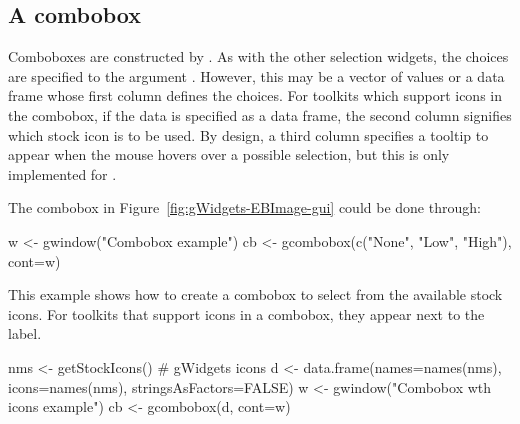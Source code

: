 



\subsection{A combobox}
\label{sec:gWidgets-combobox}

Comboboxes are constructed by . As with the
other selection widgets, the choices are specified to the argument
. However, this may be a vector of values
or a data frame whose first column defines the choices. For toolkits
which support icons in the combobox, if the data is specified as a
data frame, the second column signifies which stock icon is to be
used. By design, a third column specifies a tooltip to appear when the
mouse hovers over a possible selection, but this is only implemented
for .


The combobox in Figure~\ref{fig:gWidgets-EBImage-gui} could be done through:
\begin{Schunk}
\begin{Sinput}
 w <- gwindow("Combobox example")
 cb <- gcombobox(c("None", "Low", "High"), cont=w)
\end{Sinput}
\end{Schunk}



This example shows how to create a combobox to select from the
available stock icons. For toolkits that support icons in a combobox, they
appear next to the label.
\begin{Schunk}
\begin{Sinput}
 nms <- getStockIcons()                  # gWidgets icons
 d <- data.frame(names=names(nms), icons=names(nms), 
                 stringsAsFactors=FALSE)
 w <- gwindow("Combobox wth icons example")
 cb <- gcombobox(d, cont=w)
\end{Sinput}
\end{Schunk}


